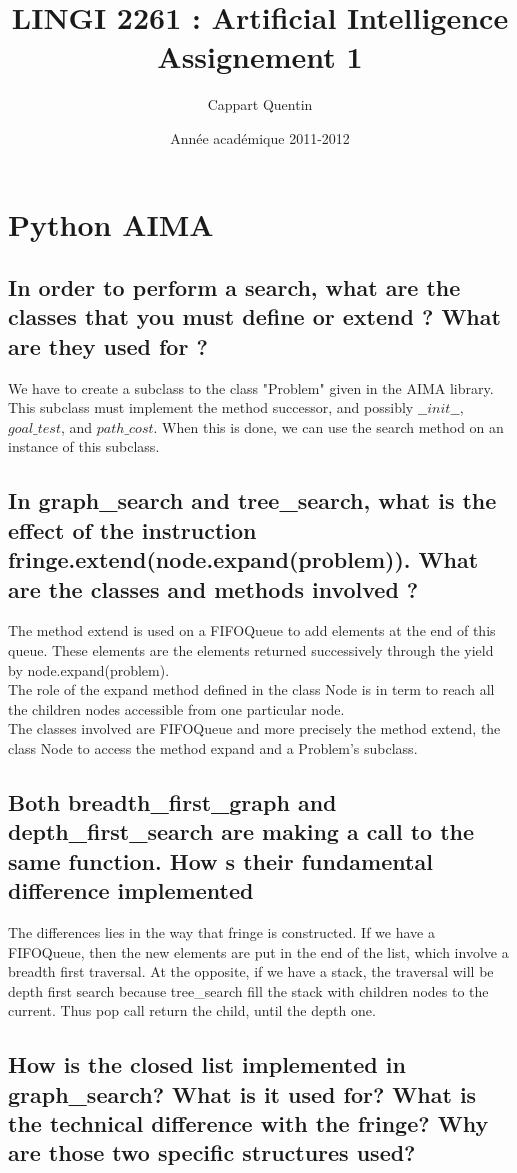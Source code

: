 \documentclass[a4paper,10pt]{article}
\title{LINGI 2261 : Artificial Intelligence \\
Assignement 1}
\author{Cappart Quentin}
\date{Année académique 2011-2012}
\begin{document}
	\section{Python AIMA}
	
	\subsection{In order to perform a search, what are the classes that you must define or extend ? What are they used for ?}
	We have to create a subclass to the class "Problem" given in the AIMA library. This subclass must implement the method successor, and possibly $ \_\_init\_\_$, $goal\_test$, and $path\_cost$. When this is done, we can use the search method on an instance of this subclass.
	\subsection{In graph\_search and tree\_search, what is the effect of the instruction fringe.extend(node.expand(problem)). What are the classes and methods involved ?}
	
	The method extend is used on a FIFOQueue to add elements at the end of this queue. These elements are the elements returned successively through the yield by node.expand(problem). \\
	The role of the expand method defined in the class Node is in term to reach all the children nodes accessible from one particular node. \\
	The classes involved are FIFOQueue and more precisely the method extend, the class Node to access the method expand and a Problem's subclass.
	
	\subsection{Both breadth\_first\_graph and depth\_first\_search are making a call to the same function. How s their fundamental difference implemented}
	
	The differences lies in the way that fringe is constructed. If we have a FIFOQueue, then the new elements are put in the end of the list, which involve a breadth first traversal. At the opposite, if we have a stack, the traversal will be depth first search because tree\_search fill the stack with children nodes to the current. Thus pop call return the child, until the depth one.
	
	\subsection{How is the closed list implemented in graph\_search? What is it used for? What
is the technical difference with the fringe? Why are those two specific structures
used?}
	
\end{document}
